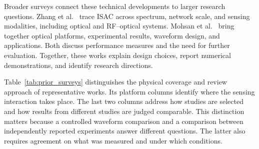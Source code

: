 Broader surveys connect these technical developments to larger research
questions. Zhang et al.\ \cite{Zhang2026ISACEvolution} trace ISAC across
spectrum, network scale, and sensing modalities, including optical and
RF--optical systems. Mohsan et al.\ \cite{Mohsan2026OISACReview} bring together
optical platforms, experimental results, waveform design, and applications.
Both discuss performance measures and the need for further evaluation.
Together, these works explain design choices, report numerical
demonstrations, and identify research directions.

Table~\ref{tab:prior_surveys} distinguishes the physical coverage and review
approach of representative works. Its platform columns identify where the
sensing interaction takes place. The last two columns address how studies
are selected and how results from different studies are judged comparable.
This distinction matters because a controlled waveform comparison and a
comparison between independently reported experiments answer different
questions. The latter also requires agreement on what was measured and under
which conditions.

